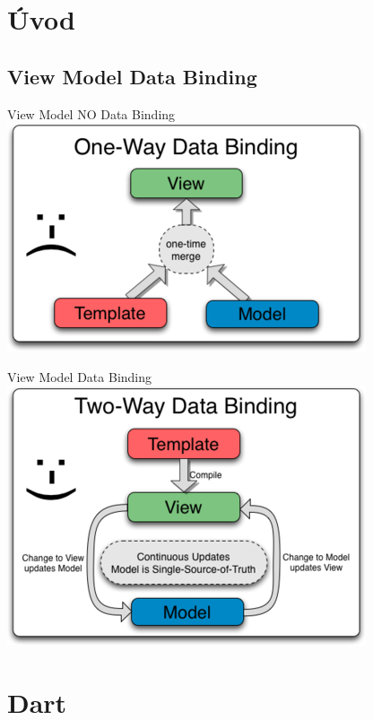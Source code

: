 
\section{Úvod}
\subsection{View Model Data Binding}
\begin{frame}{View Model NO Data Binding}
	\includegraphics[scale=0.7]{images/no-data-binding.png}
\end{frame}
\begin{frame}{View Model Data Binding}
	\includegraphics[scale=0.7]{images/data-binding.png}
\end{frame}

\section{Dart}
